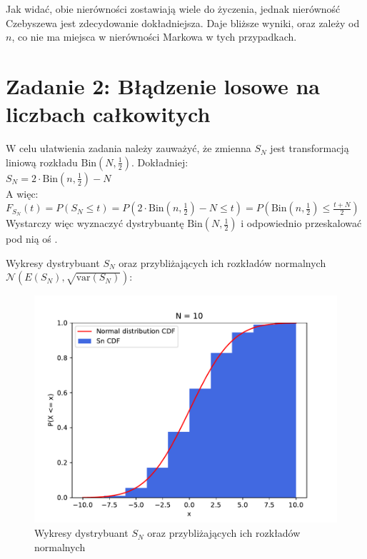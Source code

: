 \documentclass{article}
\begin{document}
Jak widać, obie nierówności zostawiają wiele do życzenia, jednak nierówność Czebyszewa jest zdecydowanie dokładniejsza.
Daje bliższe wyniki, oraz zależy od \( n \), co nie ma miejsca w nierówności Markowa w tych przypadkach.\\

\section*{Zadanie 2: Błądzenie losowe na liczbach całkowitych}

W celu ułatwienia zadania należy zauważyć, że zmienna \( S_N \) jest transformacją liniową rozkładu \( \text{Bin}\left(N, \frac{1}{2}\right) \).
Dokładniej: \\
\( S_N = 2 \cdot \text{Bin}\left(n, \frac{1}{2}\right) - N \)\\
A więc: \\
\( F_{S_N}\left(t\right) = P\left(S_N \leq t\right) = P\left(2 \cdot \text{Bin}\left(n, \frac{1}{2}\right) - N \leq t\right) = P\left(\text{Bin}\left(n, \frac{1}{2}\right) \leq \frac{t + N}{2}\right) \)\\
Wystarczy więc wyznaczyć dystrybuantę \( \text{Bin}\left(N, \frac{1}{2}\right) \) i odpowiednio przeskalować pod nią oś .

Wykresy dystrybuant \( S_N \) oraz przybliżających ich rozkładów normalnych \( \mathcal{N}\left(E\left(S_N\right), \sqrt{\text{var}\left(S_N\right)}\right) \):
\begin{figure}[h!]
    \centering
    \includegraphics[scale=0.5]{./plots/exc2.pdf}
    \caption{Wykresy dystrybuant \( S_N \) oraz przybliżających ich rozkładów normalnych}
\end{figure}
\end{document}
